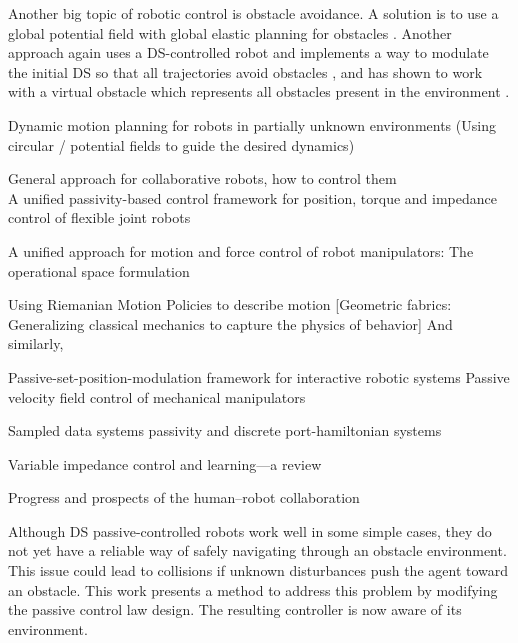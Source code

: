 \documentclass[conference]{IEEEtran}
\begin{document}


Another big topic of robotic control is obstacle avoidance. A solution is to use a global potential field with global elastic planning for obstacles \cite{tulbure2020closing}. Another approach again uses a DS-controlled robot and implements a way to modulate the initial DS so that all trajectories avoid obstacles \cite{huber2022avoiding}, and has shown to work with a virtual obstacle which represents all obstacles present in the environment \cite{huber2022fast}.

Dynamic motion planning for robots in partially unknown environments (Using circular / potential fields to guide the desired dynamics)
\cite{haddadin2011dynamic}

General approach for collaborative robots, how to control them \\
A unified passivity-based control framework for position, torque and impedance control of flexible joint robots
\cite{albu2007unified}

A unified approach for motion and force control of robot manipulators: The operational space formulation
\cite{khatib1987unified}

Using Riemanian Motion Policies to describe motion [Geometric fabrics: Generalizing classical mechanics to capture the physics of behavior]
\cite{van2022geometric}
And similarly,
\cite{cheng2020rmp}

Passive-set-position-modulation framework for interactive robotic systems
\cite{lee2010passive}
Passive velocity field control of mechanical manipulators
\cite{li1999passive}

Sampled data systems passivity and discrete port-hamiltonian systems
\cite{stramigioli2005sampled}

Variable impedance control and learning—a review
\cite{abu2020variable}

Progress and prospects of the human--robot collaboration
\cite{ajoudani2018progress}


Although DS passive-controlled robots work well in some simple cases, they do not yet have a reliable way of safely navigating through an obstacle environment. This issue could lead to collisions if unknown disturbances push the agent toward an obstacle. This work presents a method to address this problem by modifying the passive control law design. The resulting controller is now aware of its environment.
\end{document}
